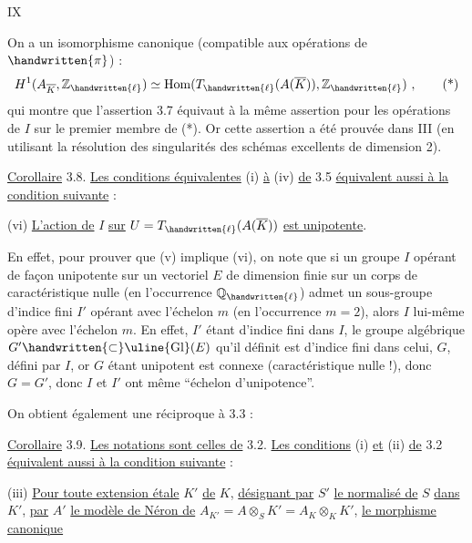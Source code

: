 \hfill IX

On a un isomorphisme canonique (compatible aux opérations de $\handwritten{\pi}$) :
\[
H^{1}(A_{\overline{K}},\mathbb{Z}_{\handwritten{\ell}})\simeq\operatorname{Hom}(T_{\handwritten{\ell}}(A(\overline{K})),\mathbb{Z}_{\handwritten{\ell}})\ ,\tag*{(*)}
\]
qui montre que l'assertion 3.7 équivaut à la même assertion pour les opérations de $I$ sur le premier membre de (*). Or cette assertion a été prouvée dans III \qquad (en utilisant la résolution des singularités des schémas excellents de dimension 2).

\uline{Corollaire} 3.8. \uline{Les conditions équivalentes} (i) \uline{à} (iv) \uline{de} 3.5 \uline{équivalent aussi à la condition suivante} :

(vi) \uline{L'action de} $I$ \uline{sur} $U=T_{\handwritten{\ell}}(A(\overline{K}))$ \uline{est unipotente}.

En effet, pour prouver que (v) implique (vi), on note que si un groupe $I$ opérant de façon unipotente sur un vectoriel $E$ de dimension finie sur un corps de caractéristique nulle (en l'occurrence $\mathbb{Q}_{\handwritten{\ell}}$) admet un sous-groupe d'indice fini $I'$ opérant avec l'échelon $m$ (en l'occurrence $m=2$), alors $I$ lui-même opère avec l'échelon $m$. En effet, $I'$ étant d'indice fini dans $I$, le groupe algébrique $G'\handwritten{\subset}\text{\uline{Gl}}(E)$ qu'il définit est d'indice fini dans celui, $G$, défini par $I$, or $G$ étant unipotent est connexe (caractéristique nulle !), donc $G=G'$, donc $I$ et $I'$ ont même ``échelon d'unipotence''.

On obtient également une réciproque à 3.3 :

\uline{Corollaire} 3.9. \uline{Les notations sont celles de} 3.2. \uline{Les conditions} (i) \uline{et} (ii) \uline{de} 3.2 \uline{équivalent aussi à la condition suivante}\handwritten{$\unsure{\backslash}$} :

(iii) \uline{Pour toute extension étale} $K'$ \uline{de} $K$, \uline{désignant par} $S'$ \uline{le normalisé de} $S$ \uline{dans} $K'$, \uline{par} $A'$ \uline{le modèle de Néron de} $A_{K'}=A\otimes_{S}K'=A_{K}\otimes_{K}K'$, \uline{le morphisme canonique}
